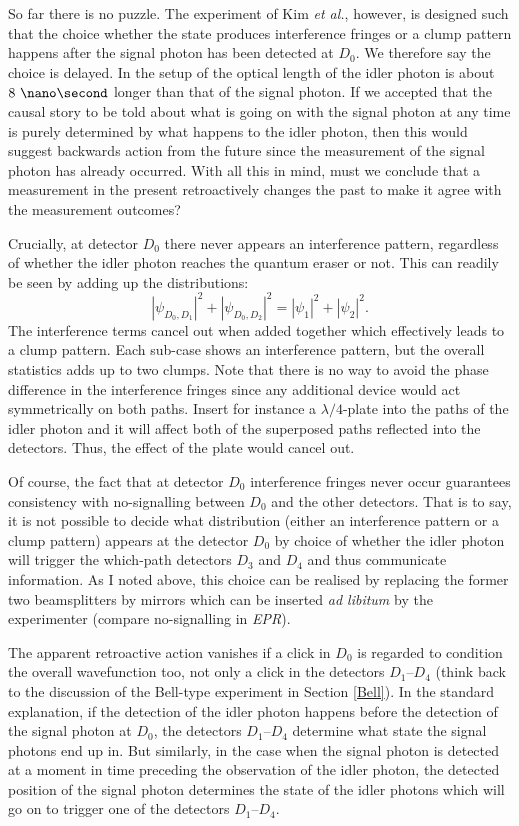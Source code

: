 \documentclass[12pt]{article}
\numberwithin{equation}{section}
\begin{document}
So far there is no puzzle. The experiment of Kim \textit{et al.}, however, is designed such that the choice whether the state produces interference fringes or a clump pattern happens after the signal photon has been detected at $D_0$. We therefore say the choice is delayed. In the setup of \cite{Kim1999} the optical length of the idler photon is about $8\ \nano\second$ longer than that of the signal photon. If we accepted that the causal story to be told about what is going on with the signal photon at any time is purely determined by what happens to the idler photon, then this would suggest backwards action from the future since the measurement of the signal photon has already occurred. With all this in mind, must we conclude that a measurement in the present retroactively changes the past to make it agree with the measurement outcomes? 

Crucially, at detector $D_0$ there never appears an interference pattern, regardless of whether the idler photon reaches the quantum eraser or not. This can readily be seen by adding up the distributions:
\begin{equation}
|\psi_{D_0, D_1}|^2 + |\psi_{D_0, D_2}|^2 = |\psi_1|^2+|\psi_2|^2.
\end{equation} The interference terms cancel out when added together which effectively leads to a clump pattern. Each sub-case shows an interference pattern, but the overall statistics adds up to two clumps. Note that there is no way to avoid the phase difference in the interference fringes since any additional device would act symmetrically on both paths. Insert for instance a $\lambda/4$-plate into the paths of the idler photon and it will affect both of the superposed paths reflected into the detectors. Thus, the effect of the plate would cancel out.

Of course, the fact that at detector $D_0$ interference fringes never occur guarantees consistency with no-signalling between $D_0$ and the other detectors. That is to say, it is not possible to decide what distribution (either an interference pattern or a clump pattern) appears at the detector $D_0$ by choice of whether the idler photon will trigger the which-path detectors $D_3$ and $D_4$ and thus communicate information.  As I noted above, this choice can be realised by replacing the former two beamsplitters by mirrors which can be inserted \textit{ad libitum} by the experimenter (compare no-signalling in \textit{EPR}).

The apparent retroactive action vanishes if a click in $D_0$ is regarded to condition the overall wavefunction too, not only a click in the detectors $D_1$--$D_4$ (think back to the discussion of the Bell-type experiment in Section \ref{Bell}). In the standard explanation, if the detection of the idler photon happens before the detection of the signal photon at $D_0$, the detectors $D_1$--$D_4$ determine what state the signal photons end up in. But similarly, in the case when the signal photon is detected at a moment in time preceding the observation of the idler photon, the detected position of the signal photon determines the state of the idler photons which will go on to trigger one of the detectors $D_1$--$D_4$. 
\end{document}
